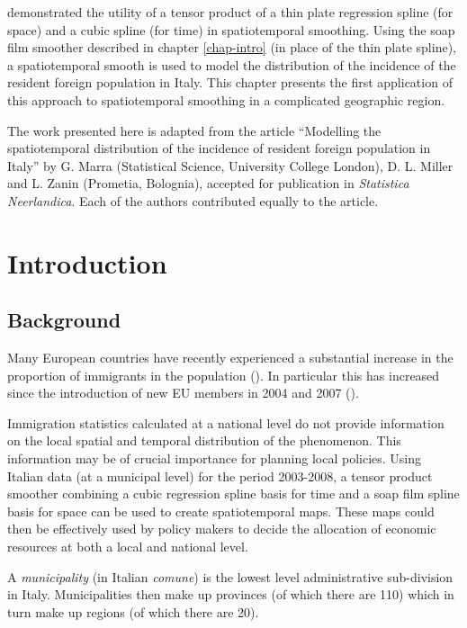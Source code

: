 \label{chap-it}

 demonstrated the utility of a tensor product of a thin plate regression spline (for space) and a cubic spline (for time) in spatiotemporal smoothing. Using the soap film smoother described in chapter \ref{chap-intro} (in place of the thin plate spline), a spatiotemporal smooth is used to model the distribution of the incidence of the resident foreign population in Italy. This chapter presents the first application of this approach to spatiotemporal smoothing in a complicated geographic region. 

The work presented here is adapted from the article ``Modelling the spatiotemporal distribution of the incidence of resident foreign population in Italy'' by G. Marra (Statistical Science, University College London), D. L. Miller and L. Zanin (Prometia, Bolognia), accepted for publication in \textit{Statistica Neerlandica}. Each of the authors contributed equally to the article.

\section{Introduction \label{IN}}

\subsection{Background}

Many European countries have recently experienced a substantial increase in the proportion of immigrants in the population (\cite{Manning2010}). In particular this has increased since the introduction of new EU members in 2004 and 2007 (\cite{euexpansion}). 

Immigration statistics calculated at a national level do not provide information on the local spatial and temporal distribution of the phenomenon. This information may be of crucial importance for planning local policies. Using Italian data (at a municipal level) for the period 2003-2008, a tensor product smoother combining a cubic regression spline basis for time and a soap film spline basis for space can be used to create spatiotemporal maps. These maps could then be effectively used by policy makers to decide the allocation of economic resources at both a local and national level.

A \textit{municipality} (in Italian \textit{comune}) is the lowest level administrative sub-division in Italy. Municipalities then make up provinces (of which there are 110) which in turn make up regions (of which there are 20).

